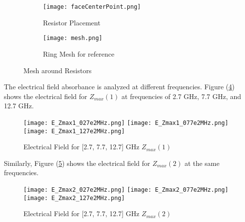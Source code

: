         \begin{figure}
            \centering
            \begin{subfigure}{0.49\textwidth}
                \centering
                \texttt{[image: faceCenterPoint.png]}
                \caption{Resistor Placement}
                \label{img:resistors}
            \end{subfigure}
            \hfill
            \begin{subfigure}{0.49\textwidth}
                \centering
                \texttt{[image: mesh.png]}
                \caption{Ring Mesh for reference}
                \label{img:RingAndArrowMesh}
            \end{subfigure}
            \caption{Mesh around Resistors}
            \label{fig:combined}
        \end{figure}

        The electrical field absorbance is analyzed at different frequencies. 
        Figure (\ref{img:E_Zmax1}) shows the electrical field for $Z_{max}(1)$
        at frequencies of 2.7 GHz, 7.7 GHz, and 12.7 GHz.
        \begin{figure}[h]
            \centering
            
            \texttt{[image: E\_Zmax1\_027e2MHz.png]}\hfil
            \texttt{[image: E\_Zmax1\_077e2MHz.png]}\hfil
            \texttt{[image: E\_Zmax1\_127e2MHz.png]}
            
            \caption{Electrical Field for [2.7, 7.7, 12.7] GHz $Z_{max}(1)$}
            \label{img:E_Zmax1}
        \end{figure}

        Similarly, Figure (\ref{img:E_Zmax2}) shows the electrical field for $Z_{max}(2)$
        at the same frequencies.
        \begin{figure}[h]
            \centering
            
            \texttt{[image: E\_Zmax2\_027e2MHz.png]}\hfil
            \texttt{[image: E\_Zmax2\_077e2MHz.png]}\hfil
            \texttt{[image: E\_Zmax2\_127e2MHz.png]}
            
            \caption{Electrical Field for [2.7, 7.7, 12.7] GHz $Z_{max}(2)$}
            \label{img:E_Zmax2}
        \end{figure}

